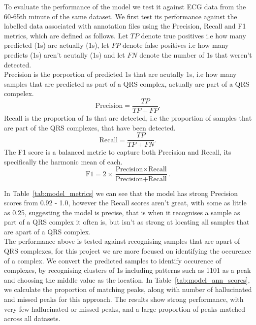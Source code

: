 To evaluate the performance of the model we test it against ECG data from the 60-65th minute of the same dataset. 
We first test its performance against the labelled data associated with annotation files using the Precision, Recall and F1 metrics,
which are defined as follows. Let $TP$ denote true positives i.e how many predicted (1s) are actually (1s), 
let $FP$ denote false positives i.e how many predicts (1s) aren't acutally (1s) and let $FN$ denote 
the number of 1s that weren't detected. \\ 
Precision is the porportion of predicted 1s that are acutally 1s, i.e how many samples that are predicted
as part of a QRS complex, actually are part of a QRS compelex. 
\[
\text{Precision} = \frac{TP}{TP + FP}.
\]
Recall is the proportion of 1s that are detected, i.e the proportion of samples that are part of the QRS complexes, 
that have been detected. 
\[
\text{Recall} = \frac{TP}{TP + FN}.
\]
The F1 score is a balanced metric to capture both Precision and Recall, its specifically the harmonic mean of each.
\[
\text{F1} = 2 \times \frac{\text{Precision} \times \text{Recall}}{\text{Precision} + \text{Recall}}.
\]

\begin{table}[H]
    \centering
    \caption{Precision, Recall and F1 metric values for each dataset from 60-65min.}
    \label{tab:model_metrics}

\end{table}
In Table~\ref{tab:model_metrics} we can see that the model has strong Precision scores from 0.92 - 1.0, 
however the Recall scores aren't great, with some as little as 0.25, suggesting the model is precise, 
that is when it recognises a sample as part of a QRS complex it often is, but isn't as strong at locating 
all samples that are apart of a QRS complex. \\

The performance above is tested against recognising samples that are apart of QRS complexes, for this project we are more 
focused on identifying the occurence of a complex. We convert the predicted samples to identify
occurence of complexes, by recognising clusters of 1s including patterns such as 1101 as a peak and choosing 
the middle value as the location.  In Table~\ref{tab:model_ann_scores}, we calculate the proportion of matching 
peaks, along with number of hallucinated and missed peaks for this approach. The results show strong performance, 
with very few hallucinated or missed peaks, and a large proportion of peaks matched across all datasets.  
\begin{table}[H]
    \centering
    \caption{Proportion of peaks found, peaks hallucinated and peaks 
    missed by model for each dataset from 60-65min.}
    \label{tab:model_ann_scores}

\end{table}

